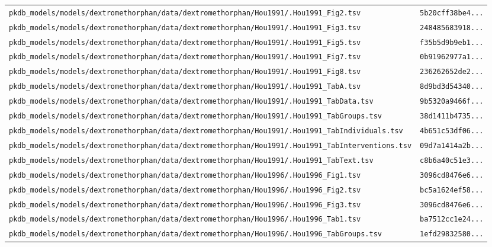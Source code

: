 \documentclass{article}
\begin{document}
\begin{longtable}{ll}
\texttt{pkdb\_models/models/dextromethorphan/data/dextromethorphan/Hou1991/.Hou1991\_Fig2.tsv} & \texttt{5b20cff38be4...} \\
\texttt{pkdb\_models/models/dextromethorphan/data/dextromethorphan/Hou1991/.Hou1991\_Fig3.tsv} & \texttt{248485683918...} \\
\texttt{pkdb\_models/models/dextromethorphan/data/dextromethorphan/Hou1991/.Hou1991\_Fig5.tsv} & \texttt{f35b5d9b9eb1...} \\
\texttt{pkdb\_models/models/dextromethorphan/data/dextromethorphan/Hou1991/.Hou1991\_Fig7.tsv} & \texttt{0b91962977a1...} \\
\texttt{pkdb\_models/models/dextromethorphan/data/dextromethorphan/Hou1991/.Hou1991\_Fig8.tsv} & \texttt{236262652de2...} \\
\texttt{pkdb\_models/models/dextromethorphan/data/dextromethorphan/Hou1991/.Hou1991\_TabA.tsv} & \texttt{8d9bd3d54340...} \\
\texttt{pkdb\_models/models/dextromethorphan/data/dextromethorphan/Hou1991/.Hou1991\_TabData.tsv} & \texttt{9b5320a9466f...} \\
\texttt{pkdb\_models/models/dextromethorphan/data/dextromethorphan/Hou1991/.Hou1991\_TabGroups.tsv} & \texttt{38d1411b4735...} \\
\texttt{pkdb\_models/models/dextromethorphan/data/dextromethorphan/Hou1991/.Hou1991\_TabIndividuals.tsv} & \texttt{4b651c53df06...} \\
\texttt{pkdb\_models/models/dextromethorphan/data/dextromethorphan/Hou1991/.Hou1991\_TabInterventions.tsv} & \texttt{09d7a1414a2b...} \\
\texttt{pkdb\_models/models/dextromethorphan/data/dextromethorphan/Hou1991/.Hou1991\_TabText.tsv} & \texttt{c8b6a40c51e3...} \\
\texttt{pkdb\_models/models/dextromethorphan/data/dextromethorphan/Hou1996/.Hou1996\_Fig1.tsv} & \texttt{3096cd8476e6...} \\
\texttt{pkdb\_models/models/dextromethorphan/data/dextromethorphan/Hou1996/.Hou1996\_Fig2.tsv} & \texttt{bc5a1624ef58...} \\
\texttt{pkdb\_models/models/dextromethorphan/data/dextromethorphan/Hou1996/.Hou1996\_Fig3.tsv} & \texttt{3096cd8476e6...} \\
\texttt{pkdb\_models/models/dextromethorphan/data/dextromethorphan/Hou1996/.Hou1996\_Tab1.tsv} & \texttt{ba7512cc1e24...} \\
\texttt{pkdb\_models/models/dextromethorphan/data/dextromethorphan/Hou1996/.Hou1996\_TabGroups.tsv} & \texttt{1efd29832580...} \\

\end{longtable}
\end{document}
